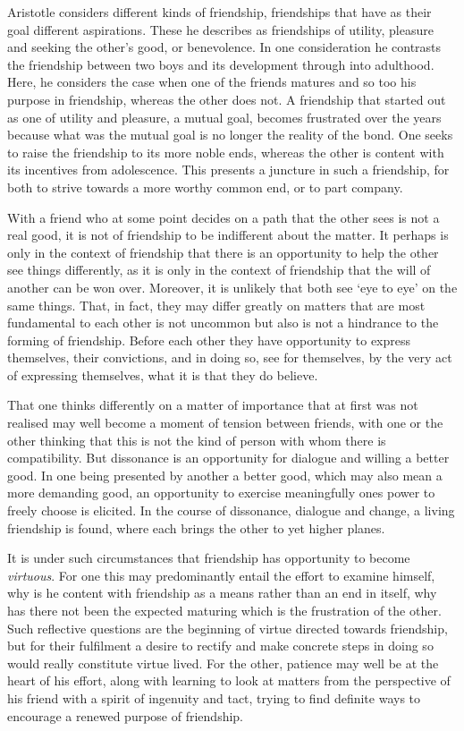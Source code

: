 \documentclass[a4paper,10pt]{article}
\begin{document}
Aristotle considers different kinds of friendship, friendships that have as their goal different aspirations. These he describes as friendships of utility, pleasure and seeking the other's good, or benevolence. In one consideration he contrasts the friendship between two boys and its development through into adulthood. Here, he considers the case when one of the friends matures and so too his purpose in friendship, whereas the other does not. A friendship that started out as one of utility and pleasure, a mutual goal, becomes frustrated over the years because what was the mutual goal is no longer the reality of the bond. One seeks to raise the friendship to its more noble ends, whereas the other is content with its incentives from adolescence. This presents a juncture in such a friendship, for both to strive towards a more worthy common end, or to part company.

With a friend who at some point decides on a path that the other sees is not a real good, it is not of friendship to be indifferent about the matter. It perhaps is only in the context of friendship that there is an opportunity to help the other see things differently, as it is only in the context of friendship that the will of another can be won over. Moreover, it is unlikely that both see `eye to eye' on the same things. That, in fact, they may differ greatly on matters that are most fundamental to each other is not uncommon but also is not a hindrance to the forming of friendship. Before each other they have opportunity to express themselves, their convictions, and in doing so, see for themselves, by the very act of expressing themselves, what it is that they do believe.

That one thinks differently on a matter of importance that at first was not realised may well become a moment of tension between friends, with one or the other thinking that this is not the kind of person with whom there is compatibility. But dissonance is an opportunity for dialogue and willing a better good. In one being presented by another a better good, which may also mean a more demanding good, an opportunity to exercise meaningfully ones power to freely choose is elicited. In the course of dissonance, dialogue and change, a living friendship is found, where each brings the other to yet higher planes.

It is under such circumstances that friendship has opportunity to become \emph{virtuous}. For one this may predominantly entail the effort to examine himself, why is he content with friendship as a means rather than an end in itself, why has there not been the expected maturing which is the frustration of the other. Such reflective questions are the beginning of virtue directed towards friendship, but for their fulfilment a desire to rectify and make concrete steps in doing so would really constitute virtue lived. For the other, patience may well be at the heart of his effort, along with learning to look at matters from the perspective of his friend with a spirit of ingenuity and tact, trying to find definite ways to encourage a renewed purpose of friendship.
\end{document}
